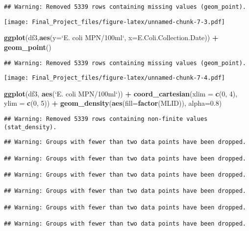 \documentclass[
]{article}
\newenvironment{Shaded}{\begin{snugshade}}{\end{snugshade}}
\newcommand{\DataTypeTok}[1]{\textcolor[rgb]{0.13,0.29,0.53}{#1}}
\newcommand{\DecValTok}[1]{\textcolor[rgb]{0.00,0.00,0.81}{#1}}
\newcommand{\FloatTok}[1]{\textcolor[rgb]{0.00,0.00,0.81}{#1}}
\newcommand{\KeywordTok}[1]{\textcolor[rgb]{0.13,0.29,0.53}{\textbf{#1}}}
\newcommand{\NormalTok}[1]{#1}
\newcommand{\OperatorTok}[1]{\textcolor[rgb]{0.81,0.36,0.00}{\textbf{#1}}}
\newcommand{\StringTok}[1]{\textcolor[rgb]{0.31,0.60,0.02}{#1}}
\begin{document}
\begin{verbatim}
## Warning: Removed 5339 rows containing missing values (geom_point).
\end{verbatim}

\texttt{[image: Final\_Project\_files/figure-latex/unnamed-chunk-7-3.pdf]}

\begin{Shaded}
\begin{Highlighting}[]
\KeywordTok{ggplot}\NormalTok{(df3,}\KeywordTok{aes}\NormalTok{(}\DataTypeTok{y=}\StringTok{`}\DataTypeTok{E. coli MPN/100ml}\StringTok{`}\NormalTok{, }\DataTypeTok{x=}\NormalTok{E.Coli.Collection.Date)) }\OperatorTok{+}\StringTok{ }\KeywordTok{geom_point}\NormalTok{()}
\end{Highlighting}
\end{Shaded}

\begin{verbatim}
## Warning: Removed 5339 rows containing missing values (geom_point).
\end{verbatim}

\texttt{[image: Final\_Project\_files/figure-latex/unnamed-chunk-7-4.pdf]}

\begin{Shaded}
\begin{Highlighting}[]
\KeywordTok{ggplot}\NormalTok{(df3, }\KeywordTok{aes}\NormalTok{(}\StringTok{`}\DataTypeTok{E. coli MPN/100ml}\StringTok{`}\NormalTok{)) }\OperatorTok{+}\StringTok{ }\KeywordTok{coord_cartesian}\NormalTok{(}\DataTypeTok{xlim =} \KeywordTok{c}\NormalTok{(}\DecValTok{0}\NormalTok{, }\DecValTok{4}\NormalTok{), }\DataTypeTok{ylim =} \KeywordTok{c}\NormalTok{(}\DecValTok{0}\NormalTok{, }\DecValTok{5}\NormalTok{)) }\OperatorTok{+}\StringTok{ }\KeywordTok{geom_density}\NormalTok{(}\KeywordTok{aes}\NormalTok{(}\DataTypeTok{fill=}\KeywordTok{factor}\NormalTok{(MLID)), }\DataTypeTok{alpha=}\FloatTok{0.8}\NormalTok{)}
\end{Highlighting}
\end{Shaded}

\begin{verbatim}
## Warning: Removed 5339 rows containing non-finite values (stat_density).
\end{verbatim}

\begin{verbatim}
## Warning: Groups with fewer than two data points have been dropped.

## Warning: Groups with fewer than two data points have been dropped.

## Warning: Groups with fewer than two data points have been dropped.

## Warning: Groups with fewer than two data points have been dropped.

## Warning: Groups with fewer than two data points have been dropped.

## Warning: Groups with fewer than two data points have been dropped.
\end{verbatim}
\end{document}
